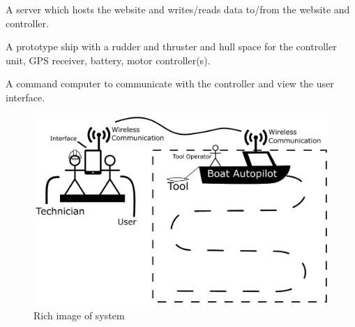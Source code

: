 A server which hosts the website and writes/reads data to/from the website and controller.

A prototype ship with a rudder and thruster and hull space for the controller unit, GPS receiver, battery, motor controller(s).

A command computer to communicate with the controller and view the user interface.

\begin{figure}[H]
	\centering
	\includegraphics[width=0.6\linewidth]{rich_image}
	\caption{Rich image of system}
	\label{table:rich_image}
\end{figure}

